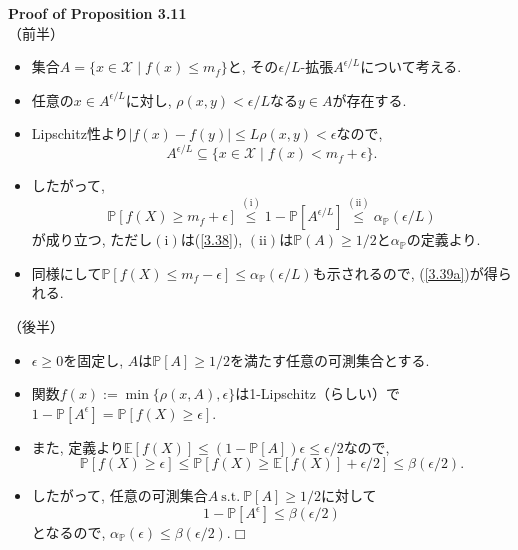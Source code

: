 \documentclass[aspectratio=169, dvipdfmx]{beamer}
\def\qed{\hfill $\Box$}
\newcommand{\ex}{\mathbb{E}}
\begin{document}
\begin{frame}{}{}
{\bf Proof of Proposition 3.11}\\
{（前半）}
\begin{itemize}
    \item 集合$A = \{x\in\mathcal{X} \mid f(x) \le m_f\}$と, その$\epsilon/L$-拡張$A^{\epsilon/L}$について考える.
    \item 任意の$x \in A^{\epsilon/L}$に対し, $\rho(x, y) < \epsilon/L$なる$y\in A$が存在する.
    \item Lipschitz性より$|f(x) - f(y)| \le L\rho(x,y) < \epsilon$なので,
    \[ A^{\epsilon/L} \subseteq \{x\in\mathcal{X} \mid f(x) < m_f + \epsilon\}. \tag{3.38}\label{3.38} \]
    \item したがって,
    \[ 
        \mathbb{P}[f(X)\ge m_f+\epsilon]
        \stackrel{\mathrm{(i)}}{\le} 1-\mathbb{P}[A^{\epsilon/L}]
        \stackrel{\mathrm{(ii)}}{\le} \alpha_{\mathbb{P}}(\epsilon/L)
    \]
     が成り立つ, ただし$\mathrm{(i)}$は(\ref{3.38}), $\mathrm{(ii)}$は$\mathbb{P}(A) \ge 1/2$と$\alpha_{\mathbb{P}}$の定義より.
    \item 同様にして$\mathbb{P}[f(X)\le m_f-\epsilon] \le \alpha_{\mathbb{P}}(\epsilon/L)$も示されるので, (\ref{3.39a})が得られる.
\end{itemize}
\end{frame}

\begin{frame}{}{}
{（後半）}
\begin{itemize}
    \item $\epsilon \ge 0$を固定し, $A$は$\mathbb{P}[A]\ge 1/2$を満たす任意の可測集合とする.
    \item 関数$f(x) := \min\{\rho(x, A), \epsilon\}$は1-Lipschitz（らしい）で$1-\mathbb{P}[A^\epsilon]=\mathbb{P}[f(X)\ge\epsilon]$.
    \item また, 定義より$\ex[f(X)] \le (1-\mathbb{P}[A])\epsilon \le \epsilon/2$なので, 
    \[ \mathbb{P}\left[f(X)\ge \epsilon\right] \le \mathbb{P}\left[f(X)\ge\ex[f(X)]+\epsilon/2\right] \le \beta(\epsilon/2). \]
    \item したがって, 任意の可測集合$A \mathrm{\ s.t.\ }\mathbb{P}[A]\ge 1/2$に対して
    \[ 1-\mathbb{P}[A^\epsilon] \le \beta(\epsilon/2) \]
    となるので, $\alpha_{\mathbb{P}}(\epsilon) \le \beta({\epsilon/2})$.\qed
\end{itemize}
\end{frame}
\end{document}
